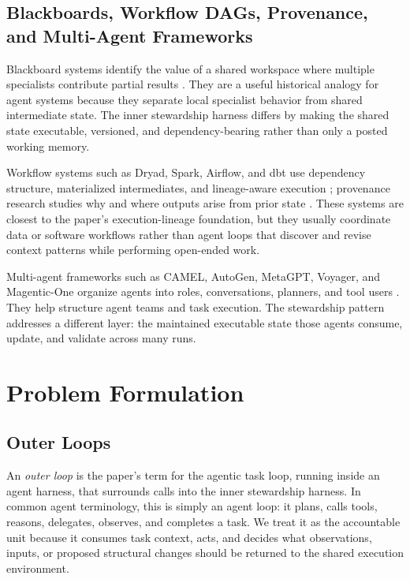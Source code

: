 \documentclass{article}
\begin{document}
\subsection{Blackboards, Workflow DAGs, Provenance, and Multi-Agent Frameworks}

Blackboard systems identify the value of a shared workspace where multiple specialists contribute partial results \cite{nii1986blackboard}. They are a useful historical analogy for agent systems because they separate local specialist behavior from shared intermediate state. The inner stewardship harness differs by making the shared state executable, versioned, and dependency-bearing rather than only a posted working memory.

Workflow systems such as Dryad, Spark, Airflow, and dbt use dependency structure, materialized intermediates, and lineage-aware execution \cite{isard2007dryad,zaharia2010spark,airflowdocs,dbtdocs}; provenance research studies why and where outputs arise from prior state \cite{buneman2001why,freire2008provenance}. These systems are closest to the paper's execution-lineage foundation, but they usually coordinate data or software workflows rather than agent loops that discover and revise context patterns while performing open-ended work.

Multi-agent frameworks such as CAMEL, AutoGen, MetaGPT, Voyager, and Magentic-One organize agents into roles, conversations, planners, and tool users \cite{li2023camel,wu2023autogen,hong2023metagpt,wang2023voyager,fourney2024magenticone}. They help structure agent teams and task execution. The stewardship pattern addresses a different layer: the maintained executable state those agents consume, update, and validate across many runs.

\section{Problem Formulation}

\subsection{Outer Loops}

An \emph{outer loop} is the paper's term for the agentic task loop, running inside an agent harness, that surrounds calls into the inner stewardship harness. In common agent terminology, this is simply an agent loop: it plans, calls tools, reasons, delegates, observes, and completes a task. We treat it as the accountable unit because it consumes task context, acts, and decides what observations, inputs, or proposed structural changes should be returned to the shared execution environment.
\end{document}
